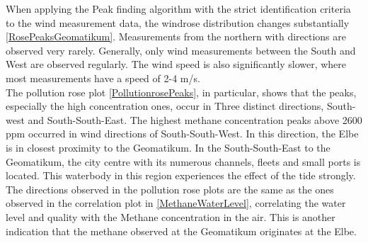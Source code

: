 When  applying the Peak finding algorithm with the strict identification criteria to the wind measurement data, the windrose distribution changes substantially \cref{RosePeaksGeomatikum}. Measurements from the northern with directions are  observed very rarely. Generally, only wind measurements between the South and West are observed regularly. The wind speed is also significantly slower, where most measurements have a speed of 2-4 m/s.\\
The pollution rose plot \cref{PollutionrosePeaks}, in particular, shows that the peaks, especially the high concentration ones, occur in Three distinct directions, South-west and South-South-East. The highest methane concentration peaks above 2600 ppm occurred in wind directions of South-South-West. In this direction, the Elbe is in closest proximity to the Geomatikum. In the South-South-East to the Geomatikum, the city centre with its numerous channels, fleets and small ports is located. This waterbody in this region experiences the effect of the tide strongly.\\
The directions observed in the pollution rose plots are the same as the ones observed in the correlation plot in \cref{MethaneWaterLevel}, correlating the water level and quality with the Methane concentration in the air. This is another indication that the methane observed at the Geomatikum originates at the Elbe.
